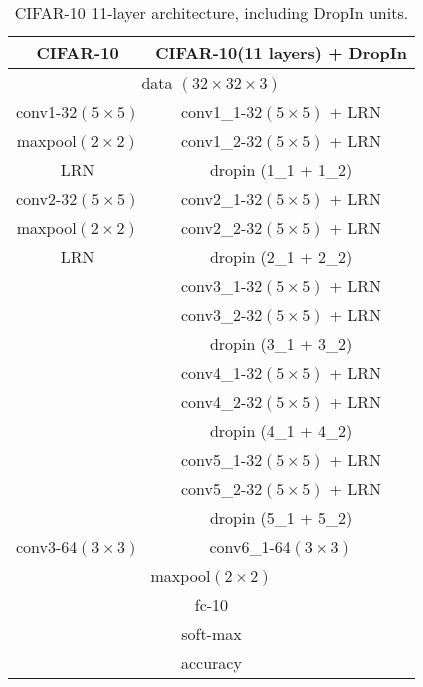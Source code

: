 \documentclass[10pt,twocolumn,letterpaper]{article}
\newcommand{\dropin}{DropIn }
\begin{document}
\begin{table}[htb]
\begin{center}
  \begin{tabular}{| c | c |}
    \hline
     CIFAR-10 &  CIFAR-10(11 layers) {\color{red}+ \dropin}   \\ \hline
    
     \multicolumn{2}{|c|}{data $(32\times32\times3)$} \\ \hline
     conv1-32$(5\times 5)$ & conv1\_1-32$(5\times 5)$ + LRN \\ 
     maxpool$(2\times2)$ & conv1\_2-32$(5\times 5)$ + LRN\\ 
     LRN & {\color{red}dropin (1\_1 + 1\_2)} \\ \hline
     conv2-32$(5\times 5)$ & conv2\_1-32$(5\times 5)$ + LRN\\ 
     maxpool$(2\times2)$ & conv2\_2-32$(5\times 5)$ + LRN\\ 
     LRN    &					{\color{red}dropin (2\_1 + 2\_2)} \\ \hline
     & conv3\_1-32$(5\times 5)$ + LRN\\ 
     & conv3\_2-32$(5\times 5)$ + LRN\\ 
     &					{\color{red}dropin (3\_1 + 3\_2)} \\ \hline
     & conv4\_1-32$(5\times 5)$ + LRN\\ 
     & conv4\_2-32$(5\times 5)$ + LRN\\ 
     &					{\color{red}dropin (4\_1 + 4\_2)} \\ \hline
     & conv5\_1-32$(5\times 5)$ + LRN\\ 
     & conv5\_2-32$(5\times 5)$ + LRN\\ 
     &					{\color{red}dropin (5\_1 + 5\_2)} \\ \hline
     conv3-64$(3\times 3)$ & conv6\_1-64$(3\times 3)$ \\  \hline
\multicolumn{2}{|c|}{maxpool$(2\times2)$} \\ \hline
\multicolumn{2}{|c|}{fc-10} \\ \hline
\multicolumn{2}{|c|}{soft-max} \\ \hline
\multicolumn{2}{|c|}{accuracy} \\ \hline
  \end{tabular}
  \caption{CIFAR-10 11-layer architecture, including \dropin units.}
  \label{tab:cifarArch}
\end{center}
  \vspace{-25pt}
\end{table}
\end{document}
